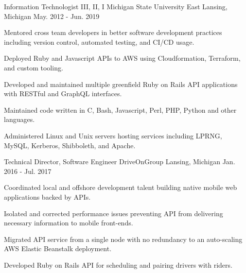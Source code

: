 \begin{cventries}
  \cventry
    {Information Technologist III, II, I} %
    {Michigan State University} %
    {East Lansing, Michigan} %
    {May. 2012 - Jun. 2019} %
    {
      \begin{cvitems} %
        \item {Mentored cross team developers in better software development practices including version control, automated testing, and CI/CD usage.}
        \item {Deployed Ruby and Javascript APIs to AWS using Cloudformation, Terraform, and custom tooling.}
        \item {Developed and maintained multiple greenfield Ruby on Rails API applications with RESTful and GraphQL interfaces.}
        \item {Maintained code written in C, Bash, Javascript, Perl, PHP, Python and other languages.}
        \item {Administered Linux and Unix servers hosting services including LPRNG, MySQL, Kerberos, Shibboleth, and Apache.}
      \end{cvitems}
    }

  \cventry
    {Technical Director, Software Engineer} %
    {DriveOnGroup} %
    {Lansing, Michigan} %
    {Jan. 2016 - Jul. 2017} %
    {
      \begin{cvitems} %
        \item {Coordinated local and offshore development talent building native mobile web applications backed by APIs.}
        \item {Isolated and corrected performance issues preventing API from delivering necessary information to mobile front-ends.}
        \item {Migrated API service from a single node with no redundancy to an auto-scaling AWS Elastic Beanstalk deployment.}
        \item {Developed Ruby on Rails API for scheduling and pairing drivers with riders.}
      \end{cvitems}
    }


\end{cventries}
